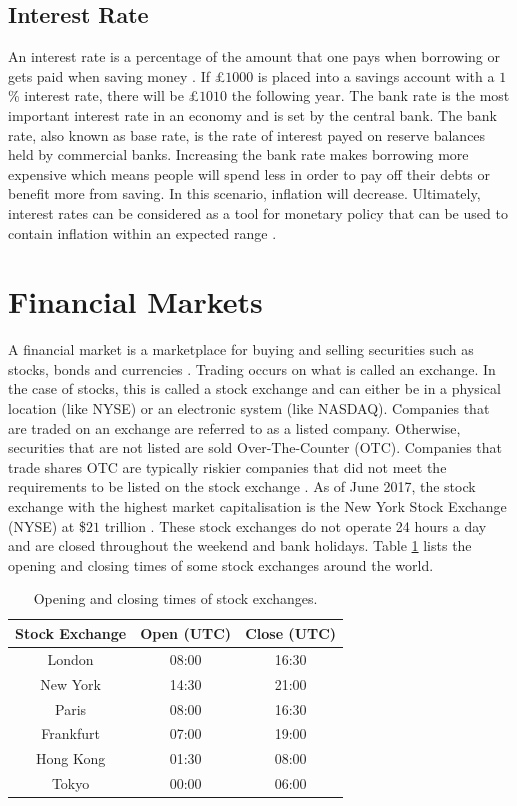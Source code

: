 \documentclass{UoYCSproject}
\begin{document}
\subsection{Interest Rate}
An interest rate is a percentage of the amount that one pays when borrowing or gets paid when saving money \cite{interestrate}. If \pounds $1000$ is placed into a savings account with a $1$\% interest rate, there will be \pounds $1010$ the following year.  The bank rate is the most important interest rate in an economy and is set by the central bank. The bank rate, also known as base rate, is the rate of interest payed on reserve balances held by commercial banks. Increasing the bank rate makes borrowing more expensive which means people will spend less in order to pay off their debts or benefit more from saving. In this scenario, inflation will decrease. Ultimately, interest rates can be considered as a tool for monetary policy that can be used to contain inflation within an expected range \cite{christiano1999monetary}. 

\section{Financial Markets}
\label{financialmarkets}
A financial market is a marketplace for buying and selling securities such as stocks, bonds and currencies \cite{financialmarket}. Trading occurs on what is called an exchange. In the case of stocks, this is called a stock exchange and can either be in a physical location (like NYSE) or an electronic system (like NASDAQ). Companies that are traded on an exchange are referred to as a listed company. Otherwise, securities that are not listed are sold Over-The-Counter (OTC). Companies that trade shares OTC are typically riskier companies that did not meet the requirements to be listed on the stock exchange \cite{stockexchange}. As of June 2017, the stock exchange with the highest market capitalisation is the New York Stock Exchange (NYSE) at \$$21$ trillion \cite{nyse}. 
These stock exchanges do not operate 24 hours a day and are closed throughout the weekend and bank holidays. Table \ref{tab:markets} lists the opening and closing times of some stock exchanges around the world. 

\begin{table}[h]
    \centering
    \begin{tabular}{|c|c|c|} \hline
        \textbf{Stock Exchange} & \textbf{Open (UTC)} & \textbf{Close (UTC)} \\ \hline
        London & 08:00 & 16:30 \\
        New York & 14:30 & 21:00 \\
        Paris & 08:00 & 16:30 \\
        Frankfurt & 07:00 & 19:00 \\
        Hong Kong & 01:30 & 08:00 \\
        Tokyo & 00:00 & 06:00 \\
        \hline
    \end{tabular}
    \caption{Opening and closing times of stock exchanges.}
    \label{tab:markets}
\end{table}
\end{document}
